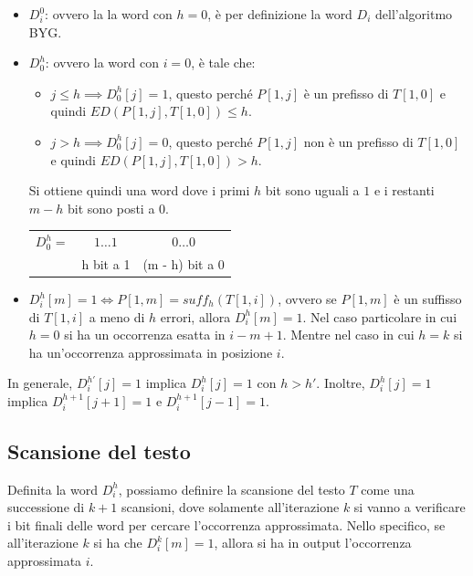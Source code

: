 \begin{itemize}
    \item $D_i^0$: ovvero la la word con $h = 0$, è per definizione la word
          $D_i$ dell'algoritmo BYG.
    \item $D_0^h$: ovvero la word con $i = 0$, è tale che:
          \begin{itemize}
              \item $j \leq h \implies D_0^h[j] = 1$, questo perché $P[1, j]$ è
                    un prefisso di $T[1, 0]$ e quindi $ED(P[1, j], T[1, 0])
                        \leq h$.
              \item $j > h \implies D_0^h[j] = 0$, questo perché $P[1, j]$ non
                    è un prefisso di $T[1, 0]$ e quindi $ED(P[1, j], T[1, 0]) >
                        h$.
          \end{itemize}
          Si ottiene quindi una word dove i primi $h$ bit sono uguali a $1$ e i
          restanti $m - h$ bit sono posti a $0$.
          \begin{table}[!ht]
              \centering
              \begin{tabular}{lcc}
                  $D_0^h =$ & $1 \dots 1$                                            &
                  $0 \dots 0$                                                          \\ \cline{2-3}
                            & \multicolumn{1}{l|}{\cellcolor[HTML]{EFEFEF}h bit a 1} &
                  \cellcolor[HTML]{EFEFEF}(m - h) bit a 0
              \end{tabular}
          \end{table}
    \item $D_i^h [m] = 1 \iff P[1, m] = suff_h(T[1, i])$, ovvero se $P[1, m]$ è
          un suffisso di $T[1, i]$ a meno di $h$ errori, allora $D_i^h[m] = 1$.
          Nel caso particolare in cui $h = 0$ si ha un occorrenza esatta in $i -
              m + 1$. Mentre nel caso in cui $h = k$ si ha un'occorrenza
          approssimata in posizione $i$.
\end{itemize}
\begin{nota}
    In generale, $D_i^{h'}[j] = 1$ implica $D_i^{h}[j] = 1$ con $h > h'$.
    Inoltre, $D_{i}^{h} [j] = 1$ implica $D_{i}^{h + 1}[j + 1] = 1$ e
    $D_{i}^{h + 1}[j - 1] = 1$.
\end{nota}
\subsection{Scansione del testo}
Definita la word $D_i^h$, possiamo definire la scansione del testo $T$ come una
successione di $k + 1$ scansioni, dove solamente all'iterazione $k$ si vanno a
verificare i bit finali delle word per cercare l'occorrenza approssimata.
Nello specifico, se all'iterazione $k$ si ha che $D_i^k[m] = 1$, allora si ha in
output l'occorrenza approssimata $i$.

